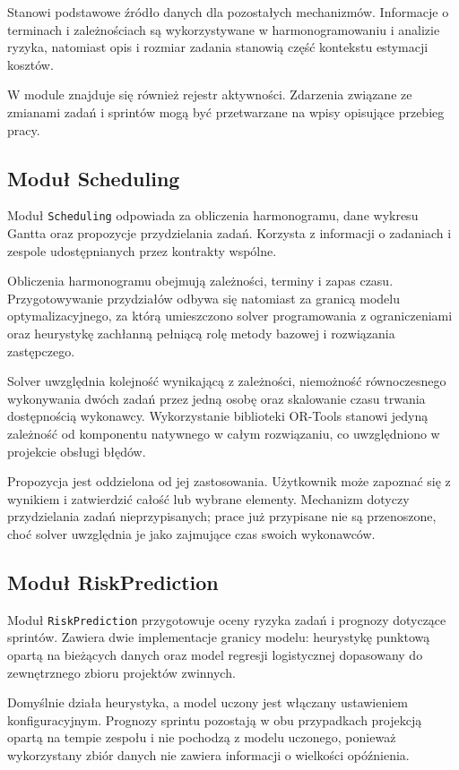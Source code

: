 Stanowi podstawowe źródło danych dla pozostałych mechanizmów. Informacje o terminach i zależnościach są wykorzystywane w harmonogramowaniu i analizie ryzyka, natomiast opis i rozmiar zadania stanowią część kontekstu estymacji kosztów.

W module znajduje się również rejestr aktywności. Zdarzenia związane ze zmianami zadań i sprintów mogą być przetwarzane na wpisy opisujące przebieg pracy.

\subsection{Moduł Scheduling}

Moduł \texttt{Scheduling} odpowiada za obliczenia harmonogramu, dane wykresu Gantta oraz propozycje przydzielania zadań. Korzysta z informacji o zadaniach i zespole udostępnianych przez kontrakty wspólne.

Obliczenia harmonogramu obejmują zależności, terminy i zapas czasu. Przygotowywanie przydziałów odbywa się natomiast za granicą modelu optymalizacyjnego, za którą umieszczono solver programowania z ograniczeniami oraz heurystykę zachłanną pełniącą rolę metody bazowej i rozwiązania zastępczego.

Solver uwzględnia kolejność wynikającą z zależności, niemożność równoczesnego wykonywania dwóch zadań przez jedną osobę oraz skalowanie czasu trwania dostępnością wykonawcy. Wykorzystanie biblioteki OR-Tools stanowi jedyną zależność od komponentu natywnego w całym rozwiązaniu, co uwzględniono w projekcie obsługi błędów.

Propozycja jest oddzielona od jej zastosowania. Użytkownik może zapoznać się z wynikiem i zatwierdzić całość lub wybrane elementy. Mechanizm dotyczy przydzielania zadań nieprzypisanych; prace już przypisane nie są przenoszone, choć solver uwzględnia je jako zajmujące czas swoich wykonawców.

\subsection{Moduł RiskPrediction}

Moduł \texttt{RiskPrediction} przygotowuje oceny ryzyka zadań i prognozy dotyczące sprintów. Zawiera dwie implementacje granicy modelu: heurystykę punktową opartą na bieżących danych oraz model regresji logistycznej dopasowany do zewnętrznego zbioru projektów zwinnych.

Domyślnie działa heurystyka, a model uczony jest włączany ustawieniem konfiguracyjnym. Prognozy sprintu pozostają w obu przypadkach projekcją opartą na tempie zespołu i nie pochodzą z modelu uczonego, ponieważ wykorzystany zbiór danych nie zawiera informacji o wielkości opóźnienia.

